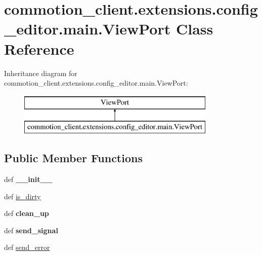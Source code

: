 \hypertarget{classcommotion__client_1_1extensions_1_1config__editor_1_1main_1_1ViewPort}{\section{commotion\-\_\-client.\-extensions.\-config\-\_\-editor.\-main.\-View\-Port Class Reference}
\label{classcommotion__client_1_1extensions_1_1config__editor_1_1main_1_1ViewPort}
}
Inheritance diagram for commotion\-\_\-client.\-extensions.\-config\-\_\-editor.\-main.\-View\-Port\-:\begin{figure}[H]
\begin{center}
\leavevmode
\includegraphics[height=2.000000cm]{classcommotion__client_1_1extensions_1_1config__editor_1_1main_1_1ViewPort}
\end{center}
\end{figure}
\subsection*{Public Member Functions}
\begin{DoxyCompactItemize}
\item 
\hypertarget{classcommotion__client_1_1extensions_1_1config__editor_1_1main_1_1ViewPort_ae9816d12a867e5655be6f810879fb44c}{def {\bfseries \-\_\-\-\_\-init\-\_\-\-\_\-}}\label{classcommotion__client_1_1extensions_1_1config__editor_1_1main_1_1ViewPort_ae9816d12a867e5655be6f810879fb44c}

\item 
def \hyperlink{classcommotion__client_1_1extensions_1_1config__editor_1_1main_1_1ViewPort_a945083e6af1674bdd5cd585fd06a5e60}{is\-\_\-dirty}
\item 
\hypertarget{classcommotion__client_1_1extensions_1_1config__editor_1_1main_1_1ViewPort_a9542b03815bcd39af6208379d4c4f010}{def {\bfseries clean\-\_\-up}}\label{classcommotion__client_1_1extensions_1_1config__editor_1_1main_1_1ViewPort_a9542b03815bcd39af6208379d4c4f010}

\item 
\hypertarget{classcommotion__client_1_1extensions_1_1config__editor_1_1main_1_1ViewPort_a1d04400c68693b3e12de487b21d94349}{def {\bfseries send\-\_\-signal}}\label{classcommotion__client_1_1extensions_1_1config__editor_1_1main_1_1ViewPort_a1d04400c68693b3e12de487b21d94349}

\item 
def \hyperlink{classcommotion__client_1_1extensions_1_1config__editor_1_1main_1_1ViewPort_a09ed3f1dcbee6e902ee8cc00a2e85091}{send\-\_\-error}
\end{DoxyCompactItemize}
